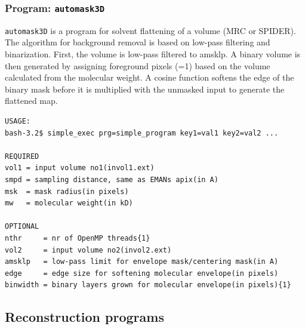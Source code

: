 \documentclass[a4paper,11pt]{article}
\newcommand{\prgname}[1]{\textcolor{NavyBlue}{\texttt{#1}}}
\begin{document}
\subsubsection{Program: \prgname{automask3D}}
\label{automask3D}
\prgname{automask3D} is a program for solvent flattening of a volume (MRC or SPIDER). The algorithm for background removal is based on low-pass filtering and binarization. First, the volume is low-pass filtered to amsklp. A binary volume is then generated by assigning foreground pixels (=1) based on the volume calculated from the molecular weight. A cosine function softens the edge of the binary mask before it is  multiplied with the unmasked input to generate the flattened map.

\begin{verbatim}
USAGE:
bash-3.2$ simple_exec prg=simple_program key1=val1 key2=val2 ...

REQUIRED
vol1 = input volume no1(invol1.ext)
smpd = sampling distance, same as EMANs apix(in A)
msk  = mask radius(in pixels)
mw   = molecular weight(in kD)

OPTIONAL
nthr     = nr of OpenMP threads{1}
vol2     = input volume no2(invol2.ext)
amsklp   = low-pass limit for envelope mask/centering mask(in A)
edge     = edge size for softening molecular envelope(in pixels)
binwidth = binary layers grown for molecular envelope(in pixels){1}
\end{verbatim}

\subsection{Reconstruction programs}
\end{document}

